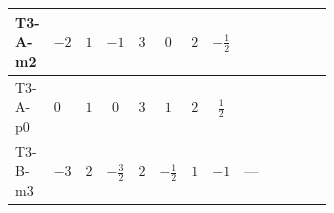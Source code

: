 \documentclass[8pt]{article}
\begin{document}
\begin{landscape}
\begin{longtable}{@{}llcccccc >{\raggedright\arraybackslash}p{0.21\linewidth} >{\raggedright\arraybackslash}p{0.21\linewidth} >{\raggedright\arraybackslash}p{0.21\linewidth}@{}}
\midrule
T3-A-m2 & $-2$ & $1$ & $-1$ & $3$ & $0$ & $2$ & $-\frac{1}{2}$ & \scriptsize\adjustbox{max width=\linewidth}{$\begin{gathered} {\lambda_{HS_2}^{(1)}} (2 T_{\nu}^{(2)}+6 \operatorname{Tr}\!\left({Y_d}\,\left({Y_d}\right)^{\dagger}\right)+2 \operatorname{Tr}\!\left({Y_e}\,\left({Y_e}\right)^{\dagger}\right)+6 \operatorname{Tr}\!\left({Y_u}\,\left({Y_u}\right)^{\dagger}\right)+4 {\lambda_{S_2}^{(A)}})\end{gathered}$} & \scriptsize\adjustbox{max width=\linewidth}{$\begin{gathered} -2 \operatorname{Tr}\!\left({y_2}\,\left({y_2}\right)^{\dagger}\,{Y_e}\,\left({Y_e}\right)^{\dagger}\right)\end{gathered}$} & \scriptsize\adjustbox{max width=\linewidth}{$\begin{gathered} +4 {\lambda_5} \left({\lambda_5}\right)^{*}\end{gathered}$} \\
\midrule
T3-A-p0 & $0$ & $1$ & $0$ & $3$ & $1$ & $2$ & $\frac{1}{2}$ & \scriptsize\adjustbox{max width=\linewidth}{$\begin{gathered} {\lambda_{HS_2}^{(1)}} (2 T_{\nu}^{(2)}+6 \operatorname{Tr}\!\left({Y_d}\,\left({Y_d}\right)^{\dagger}\right)+2 \operatorname{Tr}\!\left({Y_e}\,\left({Y_e}\right)^{\dagger}\right)+6 \operatorname{Tr}\!\left({Y_u}\,\left({Y_u}\right)^{\dagger}\right)+4 {\lambda_{S_2}^{(A)}})\end{gathered}$} & \scriptsize\adjustbox{max width=\linewidth}{$\begin{gathered} -2 \operatorname{Tr}\!\left({y_2}\,\left({y_2}\right)^{\dagger}\,{Y_e}\,\left({Y_e}\right)^{\dagger}\right)\end{gathered}$} & \scriptsize\adjustbox{max width=\linewidth}{$\begin{gathered} +4 {\lambda_5} \left({\lambda_5}\right)^{*}\end{gathered}$} \\
\midrule
T3-B-m3 & $-3$ & $2$ & $-\frac{3}{2}$ & $2$ & $-\frac{1}{2}$ & $1$ & $-1$ & --- & \scriptsize\adjustbox{max width=\linewidth}{$\begin{gathered} -2 \operatorname{Tr}\!\left({y_2}\,\left({y_2}\right)^{\dagger}\,{Y_e}\,\left({Y_e}\right)^{\dagger}\right)\end{gathered}$} & \scriptsize\adjustbox{max width=\linewidth}{$\begin{gathered} +6 {\lambda_5} \left({\lambda_5}\right)^{*}\end{gathered}$} \\

\end{longtable}
\end{landscape}
\end{document}
